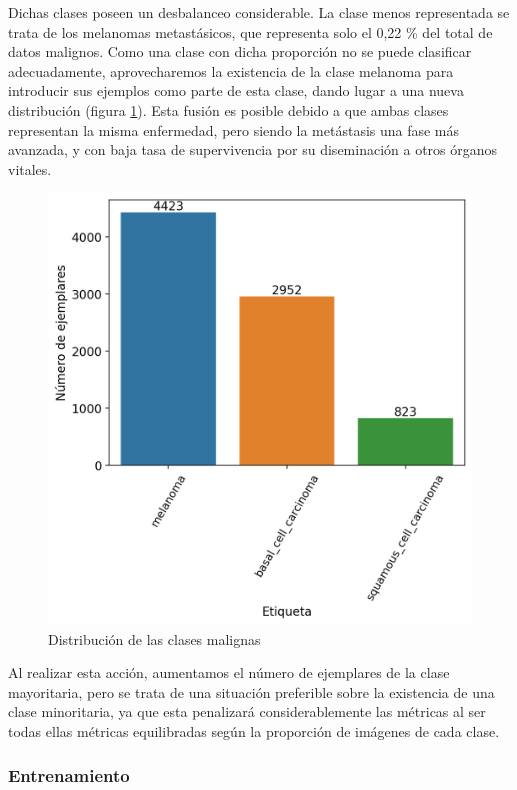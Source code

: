 Dichas clases poseen un desbalanceo considerable. La clase menos representada se trata de los melanomas metastásicos, que representa solo el 0,22 \% del total de datos malignos. Como una clase con dicha proporción no se puede clasificar adecuadamente, aprovecharemos la existencia de la clase melanoma para introducir sus ejemplos como parte de esta clase, dando lugar a una nueva distribución (figura \ref{fig:malas}). Esta fusión es posible debido a que ambas clases representan la misma enfermedad, pero siendo la metástasis una fase más avanzada, y con baja tasa de supervivencia por su diseminación a otros órganos vitales.

\begin{figure}[H]
	\centering
	\includegraphics[scale = 0.6]{imagenes/countmalignant.png}
	\caption{Distribución de las clases malignas}
	\label {fig:malas}
\end{figure}


Al realizar esta acción, aumentamos el número de ejemplares de la clase mayoritaria, pero se trata de una situación preferible sobre la existencia de una clase minoritaria, ya que esta penalizará considerablemente las métricas al ser todas ellas métricas equilibradas según la proporción de imágenes de cada clase.

\subsubsection{Entrenamiento}

